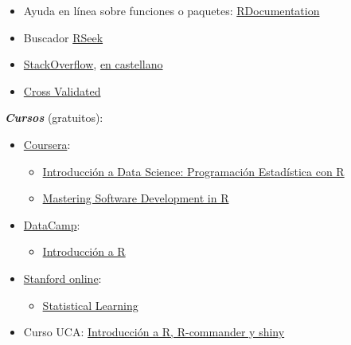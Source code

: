 \documentclass[
]{book}
\providecommand{\tightlist}{%
  \setlength{\itemsep}{0pt}\setlength{\parskip}{0pt}}
\theoremstyle{break}
\theoremstyle{definition}
\theoremstyle{definition}
\theoremstyle{definition}
\theoremstyle{remark}
\begin{document}
\begin{itemize}
\item
  Ayuda en línea sobre funciones o paquetes: \href{https://www.rdocumentation.org/}{RDocumentation}
\item
  Buscador \href{http://rseek.org/}{RSeek}
\item
  \href{http://stackoverflow.com/questions/tagged/r}{StackOverflow}, \href{https://es.stackoverflow.com/questions/tagged/r}{en castellano}
\item
  \href{https://stats.stackexchange.com}{Cross Validated}
\end{itemize}

\textbf{\emph{Cursos}} (gratuitos):

\begin{itemize}
\item
  \href{https://www.coursera.org/}{Coursera}:

  \begin{itemize}
  \item
    \href{https://www.coursera.org/learn/intro-data-science-programacion-estadistica-r}{Introducción a Data Science: Programación Estadística con R}
  \item
    \href{https://www.coursera.org/specializations/r}{Mastering Software Development in R}
  \end{itemize}
\end{itemize}

\begin{itemize}
\item
  \href{https://www.datacamp.com/courses}{DataCamp}:

  \begin{itemize}
  \tightlist
  \item
    \href{https://www.datacamp.com/courses/introduccion-a-r/}{Introducción a R}
  \end{itemize}
\end{itemize}

\begin{itemize}
\item
  \href{http://online.stanford.edu/courses}{Stanford online}:

  \begin{itemize}
  \tightlist
  \item
    \href{http://online.stanford.edu/course/statistical-learning}{Statistical Learning}
  \end{itemize}
\end{itemize}

\begin{itemize}
\tightlist
\item
  Curso UCA: \href{http://knuth.uca.es/moodle/course/view.php?id=51}{Introducción a R, R-commander y shiny}
\end{itemize}
\end{document}
